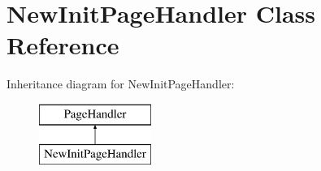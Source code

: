 \hypertarget{classNewInitPageHandler}{\section{New\-Init\-Page\-Handler Class Reference}
\label{classNewInitPageHandler}
}
Inheritance diagram for New\-Init\-Page\-Handler\-:\begin{figure}[H]
\begin{center}
\leavevmode
\includegraphics[height=2.000000cm]{classNewInitPageHandler}
\end{center}
\end{figure}
